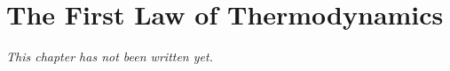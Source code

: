 \chapter{The First Law of Thermodynamics}\label{ch:b1:first-law}


\emph{This chapter has not been written yet.}
